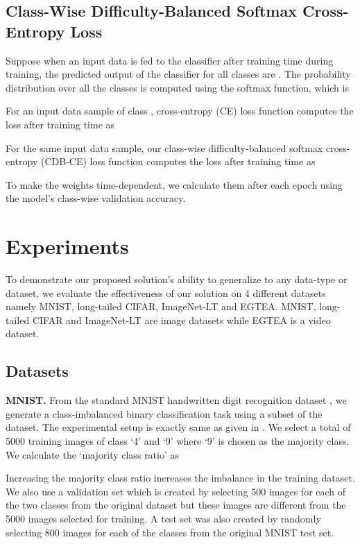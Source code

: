 \documentclass[runningheads]{llncs}
\begin{document}
\subsection{Class-Wise Difficulty-Balanced Softmax Cross-Entropy Loss}
Suppose when an input data is fed to the classifier after training time  
during
training, the predicted output of the classifier for all  classes are . 
The probability distribution 
 over all the classes is computed using 
the
softmax function, which is


For an input data sample of class , cross-entropy (CE) loss function computes 
the
loss after training time  as

For the same input data sample, our class-wise difficulty-balanced softmax 
cross-entropy (CDB-CE) loss function computes the loss after training time  
as

To make the weights time-dependent, we calculate them 
after
each epoch using the model’s class-wise validation accuracy.


\section{Experiments}
To demonstrate our proposed solution’s ability to generalize to any data-type or
dataset, we evaluate the effectiveness of our solution on 4 different datasets 
namely
MNIST, long-tailed CIFAR, ImageNet-LT and EGTEA. MNIST, long-tailed CIFAR and ImageNet-LT are image 
datasets while EGTEA is a video dataset.

\subsection{Datasets}
\textbf{MNIST.} From the standard MNIST handwritten digit recognition 
dataset \cite{MNIST_data}, we
generate a class-imbalanced binary classification task using a subset of the 
dataset.
The experimental setup is exactly same as given in \cite{reweighting_examples}. We select a total of 
5000 training images of class ‘4’ and ‘9’ where ‘9’ is chosen as the majority 
class. We calculate
the ‘majority class ratio’ as

Increasing the majority class ratio increases the imbalance in the training 
dataset. We also use a validation set which is created by selecting 500 images 
for each of the two classes from the original dataset but these images are 
different from the 5000 images selected for training. A test set was 
also created by randomly selecting 800 images for each of the classes from the 
original MNIST test set.
\end{document}
